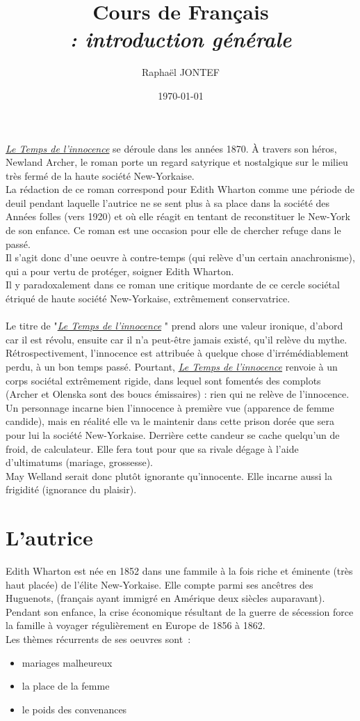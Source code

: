 \documentclass[a4paper,12pt]{article}
\title{Cours de Français\\ \Large \textit{\lti : introduction générale}}
\author{Raphaël JONTEF}
\date{\today}
\newcommand{\lti}{\underline{\textit{Le Temps de l'innocence}} }
\begin{document}
\maketitle

\lti se déroule dans les années 1870. À travers son héros, Newland Archer, le roman porte un regard satyrique et nostalgique sur le milieu très fermé de la haute société New-Yorkaise.\\
La rédaction de ce roman correspond pour Edith Wharton comme une période de deuil pendant laquelle l'autrice ne se sent plus à sa place dans la société des Années folles (vers 1920) et où elle réagit en tentant de reconstituer le New-York de son enfance. Ce roman est une occasion pour elle de chercher refuge dans le passé.\\
Il s'agit donc d'une oeuvre à contre-temps (qui relève d'un certain anachronisme), qui a pour vertu de protéger, soigner Edith Wharton.\\
Il y paradoxalement dans ce roman une critique mordante de ce cercle sociétal étriqué de haute société New-Yorkaise, extrêmement conservatrice.\\\\

Le titre de "\lti" prend alors une valeur ironique, d'abord car il est révolu, ensuite car il n'a peut-être jamais existé, qu'il relève du mythe.\\
Rétrospectivement, l'innocence est attribuée à quelque chose d'irrémédiablement perdu, à un bon temps passé. Pourtant, \lti renvoie à un corps sociétal extrêmement rigide, dans lequel sont fomentés des complots (Archer et Olenska sont des boucs émissaires) : rien qui ne relève de l'innocence.\\ Un personnage incarne bien l'innocence à première vue (apparence de femme candide), mais en réalité elle va le maintenir dans cette prison dorée que sera pour lui la société New-Yorkaise. Derrière cette candeur se cache quelqu'un de froid, de calculateur. Elle fera tout pour que sa rivale dégage à l'aide d'ultimatums (mariage, grossesse).\\
May Welland serait donc plutôt ignorante qu'innocente. Elle incarne aussi la frigidité (ignorance du plaisir).

\section{L'autrice}
Edith Wharton est née en 1852 dans une fammile à la fois riche et éminente (très haut placée) de l'élite New-Yorkaise. Elle compte parmi ses ancêtres des Huguenots, (français ayant immigré en Amérique deux siècles auparavant). Pendant son enfance, la crise économique résultant de la guerre de sécession force la famille à voyager régulièrement en Europe de 1856 à 1862.\\
Les thèmes récurrents de ses oeuvres sont~:
\begin{itemize}
    \item mariages malheureux
    \item la place de la femme
    \item le poids des convenances
\end{itemize}
\end{document}
